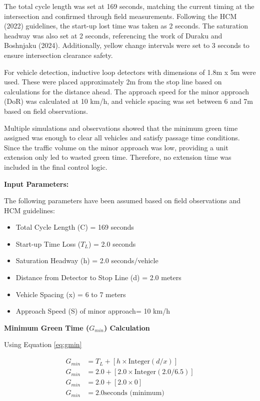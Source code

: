  The total cycle length was set at 169 seconds, matching the 
 current timing at the intersection and confirmed through 
 field measurements. Following the HCM (2022) guidelines, 
 the start-up lost time was taken as 2 seconds. The saturation 
 headway was also set at 2 seconds, referencing the work of 
 Duraku and Boshnjaku (2024). Additionally, yellow change 
 intervals were set to 3 seconds to ensure intersection 
 clearance safety.

 For vehicle detection, inductive loop detectors with dimensions 
 of 1.8m x 5m were used. These were placed approximately 2m 
 from the stop line based on calculations for the distance 
 ahead. The approach speed for the minor approach (DoR) 
 was calculated at 10 km/h, and vehicle spacing was set 
 between 6 and 7m based on field observations.

 Multiple simulations and observations showed that the 
 minimum green time assigned was enough to clear all 
 vehicles and satisfy passage time conditions. Since the 
 traffic volume on the minor approach was low, providing a unit 
 extension only led to wasted green time. Therefore, no 
 extension time was included in the final control logic.

 \textbf{Input Parameters:}

 The following parameters have been assumed based on 
 field observations and HCM guidelines:
 \begin{itemize}
    \item Total Cycle Length (C) = 169 seconds
    \item Start-up Time Loss ($T_L$) = 2.0 seconds 
    \item Saturation Headway (h) = 2.0 seconds/vehicle
    \item Distance from Detector to Stop Line (d) = 2.0 meters
    \item Vehicle Spacing (x) = 6 to 7 meters
    \item Approach Speed (S) of minor approach= 10 km/h 
 \end{itemize}


\textbf{Minimum Green Time ($G_{min}$) Calculation}

Using Equation \eqref{eq:gmin}

\begin{align*}
G_{min} &= T_L + [h \times \text{Integer}(d / x)] \\
G_{min} &= 2.0 + [2.0 \times \text{Integer}(2.0 / 6.5)] \\
G_{min} &= 2.0 + [2.0 \times 0] \\
G_{min} &= 2.0  \text{seconds  (minimum)}
\end{align*}


